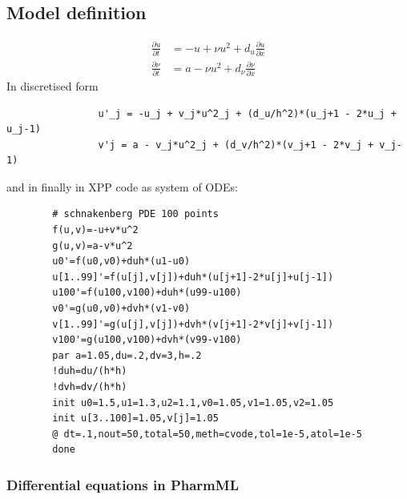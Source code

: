 \subsection*{Model definition}

\begin{align}
\frac{\partial u}{\partial t} & = -u + \nu u^2 + d_{u} \frac{\partial u}{\partial x} \nonumber \\
\frac{\partial \nu}{\partial t} & = a - \nu u^2 + d_{\nu} \frac{\partial \nu}{\partial x} \nonumber 
\end{align}
\smallskip
In discretised form
\lstset{language=MLX}
\begin{lstlisting}
				u'_j = -u_j + v_j*u^2_j + (d_u/h^2)*(u_j+1 - 2*u_j + u_j-1) 
				v'j = a - v_j*u^2_j + (d_v/h^2)*(v_j+1 - 2*v_j + v_j-1)
\end{lstlisting}
and in finally in XPP code as system of ODEs:
\lstset{language=MLX}
\begin{lstlisting}
        # schnakenberg PDE 100 points
        f(u,v)=-u+v*u^2
        g(u,v)=a-v*u^2
        u0'=f(u0,v0)+duh*(u1-u0)
        u[1..99]'=f(u[j],v[j])+duh*(u[j+1]-2*u[j]+u[j-1])
        u100'=f(u100,v100)+duh*(u99-u100)
        v0'=g(u0,v0)+dvh*(v1-v0)
        v[1..99]'=g(u[j],v[j])+dvh*(v[j+1]-2*v[j]+v[j-1])
        v100'=g(u100,v100)+dvh*(v99-v100)
        par a=1.05,du=.2,dv=3,h=.2
        !duh=du/(h*h)
        !dvh=dv/(h*h)
        init u0=1.5,u1=1.3,u2=1.1,v0=1.05,v1=1.05,v2=1.05
        init u[3..100]=1.05,v[j]=1.05
        @ dt=.1,nout=50,total=50,meth=cvode,tol=1e-5,atol=1e-5
        done
\end{lstlisting}


\subsubsection*{Differential equations in PharmML}

